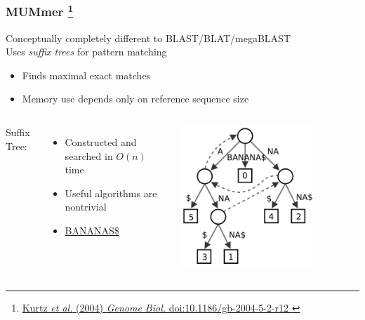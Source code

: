 %
\begin{frame}
  \frametitle{MUMmer
  \footnote{\tiny{\href{http://dx.doi.org/10.1186/gb-2004-5-2-r12
}{Kurtz \textit{et al.} (2004) \textit{Genome Biol.} doi:10.1186/gb-2004-5-2-r12
}}}
  }
  Conceptually completely different to BLAST/BLAT/megaBLAST \\
  \textcolor{RawSienna}{Uses \textit{suffix trees} for pattern matching}
  \begin{itemize}
    \item \textcolor{hutton_green}{Finds maximal exact matches}
    \item \textcolor{hutton_blue}{Memory use depends only on reference sequence size}
  \end{itemize}
  \begin{columns}[T] 
      \textcolor{hutton_purple}{Suffix Tree:}
      \begin{itemize}
        \item Constructed and searched in $O(n)$ time
        \item Useful algorithms are nontrivial
        \item \url{BANANAS$}
      \end{itemize}
      \includegraphics[width=0.75\textwidth]{images/suffix_tree}
  \end{columns}    
\end{frame}

